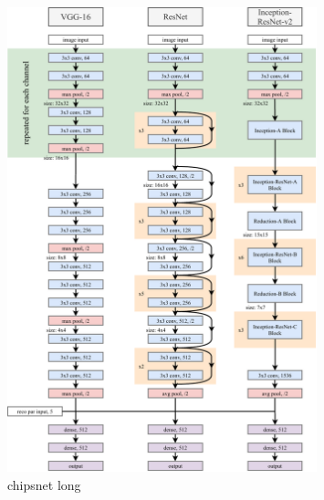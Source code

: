 \begin{figure} %
    \includegraphics[width=0.8\textwidth]{diagrams/7-cvn/chipsnet.pdf}
    \caption[chipsnet short]
    {chipsnet long}
    \label{fig:chipsnet}
\end{figure} %

